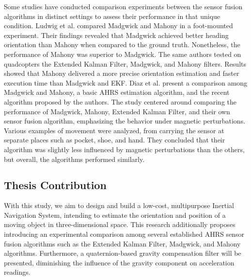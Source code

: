 Some studies have conducted comparison experiments between the sensor fusion algorithms in distinct settings to assess their performance in that unique condition. Ludwig et al. \cite{ludwig2018comparison} compared Madgwick and Mahony in a foot-mounted experiment. Their findings revealed that Madgwick achieved better heading orientation than Mahony when compared to the ground truth. Nonetheless, the performance of Mahony was superior to Madgwick. The same authors tested on \cite{ludwig2018comparisonuav} quadcopters the Extended Kalman Filter, Madgwick, and Mahony filters. Results showed that Mahony delivered a more precise orientation estimation and faster execution time than Madgwick and EKF. Diaz et al. \cite{diaz2015evaluation} present a comparison among Madgwick and Mahony, a basic AHRS estimation algorithm, and the recent algorithm proposed by the authors. The study centered around comparing the performance of Madgwick, Mahony, Extended Kalman Filter, and their own sensor fusion algorithm, emphasizing the behavior under magnetic perturbations. Various examples of movement were analyzed, from carrying the sensor at separate places such as pocket, shoe, and hand. They concluded that their algorithm was slightly less influenced by magnetic perturbations than the others, but overall, the algorithms performed similarly.



\subsection{Thesis Contribution}

With this study, we aim to design and build a low-cost, multipurpose Inertial Navigation System, intending to estimate the orientation and position of a moving object in three-dimensional space. This research additionally proposes introducing an experimental comparison among several established AHRS sensor fusion algorithms such as the Extended Kalman Filter, Madgwick, and Mahony algorithms. Furthermore, a quaternion-based gravity compensation filter will be presented, diminishing the influence of the gravity component on acceleration readings.